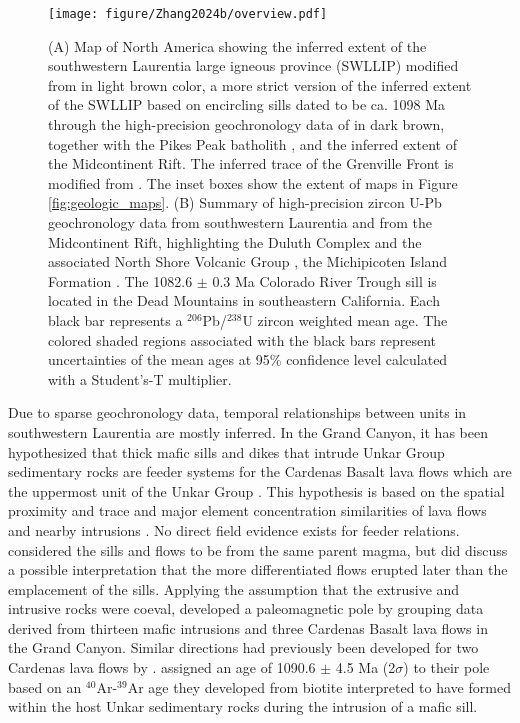 \begin{figure}[h!]
\centering
\texttt{[image: figure/Zhang2024b/overview.pdf]}
\caption{ (A) Map of North America showing the inferred extent of the southwestern Laurentia large igneous province (SWLLIP) modified from \cite{Bright2014a} in light brown color, a more strict version of the inferred extent of the SWLLIP based on encircling sills dated to be ca. 1098 Ma through the high-precision geochronology data of \cite{Mohr2024a} in dark brown, together with the Pikes Peak batholith \citep{Green1992b}, and the inferred extent of the Midcontinent Rift. The inferred trace of the Grenville Front is modified from \cite{Rivers2015a}. The inset boxes show the extent of maps in Figure \ref{fig:geologic_maps}. (B) Summary of high-precision zircon U-Pb geochronology data from southwestern Laurentia \citep{Mohr2024a} and from the Midcontinent Rift, highlighting the Duluth Complex and the associated North Shore Volcanic Group \citep{Swanson-Hysell2019a, Swanson-Hysell2021a}, the Michipicoten Island Formation \citep{Fairchild2017a}. The 1082.6 $\pm$ 0.3 Ma Colorado River Trough sill is located in the Dead Mountains in southeastern California. Each black bar represents a $^{206}$Pb/$^{238}$U zircon weighted mean age. The colored shaded regions associated with the black bars represent uncertainties of the mean ages at 95\% confidence level calculated with a Student's-T multiplier.}
\label{fig:overview}
\end{figure}
    
Due to sparse geochronology data, temporal relationships between units in southwestern Laurentia are mostly inferred. In the Grand Canyon, it has been hypothesized that thick mafic sills and dikes that intrude Unkar Group sedimentary rocks are feeder systems for the Cardenas Basalt lava flows which are the uppermost unit of the Unkar Group \cite[e.g.][]{Hammond1990a, Timmons2005a}. This hypothesis is based on the spatial proximity and trace and major element concentration similarities of lava flows and nearby intrusions \citep{Larson1994a}. No direct field evidence exists for feeder relations. \cite{Hendricks1989a} considered the sills and flows to be from the same parent magma, but did discuss a possible interpretation that the more differentiated flows erupted later than the emplacement of the sills. Applying the assumption that the extrusive and intrusive rocks were coeval, \cite{Weil2003a} developed a paleomagnetic pole by grouping data derived from thirteen mafic intrusions and three Cardenas Basalt lava flows in the Grand Canyon. Similar directions had previously been developed for two Cardenas lava flows by \cite{Elston1973a}. \cite{Weil2003a} assigned an age of 1090.6 $\pm$ 4.5 Ma (2$\sigma$) to their pole based on an $^{40}$Ar-$^{39}$Ar age they developed from biotite interpreted to have formed within the host Unkar sedimentary rocks during the intrusion of a mafic sill. 


